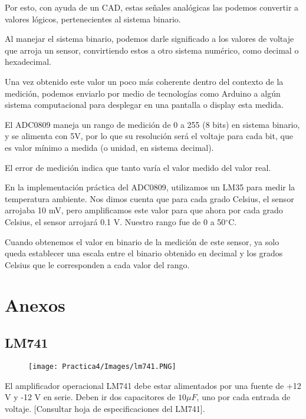 \documentclass[12pt]{article}
\begin{document}
	    Por esto, con ayuda de un CAD, estas señales analógicas las podemos convertir a valores lógicos, pertenecientes al sistema binario. 
	    
	    Al manejar el sistema binario, podemos darle significado a los valores de voltaje que arroja un sensor, convirtiendo estos a otro sistema numérico, como decimal o hexadecimal.
	    
	    Una vez obtenido este valor un poco más coherente dentro del contexto de la medición, podemos enviarlo por medio de tecnologías como Arduino a algún sistema computacional para desplegar en una pantalla o display esta medida.
	    
	    El ADC0809 maneja un rango de medición de 0 a 255 (8 bits) en sistema binario, y se alimenta con 5V, por lo que su resolución será el voltaje para cada bit, que es valor mínimo a medida (o unidad, en sistema decimal).
	    
	    El error de medición indica que tanto varía el valor medido del valor real.
	    
	    En la implementación práctica del ADC0809, utilizamos un LM35 para medir la temperatura ambiente. Nos dimos cuenta que para cada grado Celsius, el sensor arrojaba 10 mV, pero amplificamos este valor para que ahora por cada grado Celsius, el sensor arrojará 0.1 V. Nuestro rango fue de 0 a 50$^{\circ}$C.
	    
	    Cuando obtenemos el valor en binario de la medición de este sensor, ya solo queda establecer una escala entre el binario obtenido en decimal y los grados Celsius que le corresponden a cada valor del rango.
	    

		\newpage
	
	\section{Anexos}
	    \subsection{LM741}
	        \begin{figure}[h!]
                \centering
                \texttt{[image: Practica4/Images/lm741.PNG]}
            \end{figure} 
	        El amplificador operacional LM741 debe estar alimentados por una fuente de +12 V y -12 V en serie. Deben ir dos capacitores de $10\mu F$, uno por cada entrada de voltaje. [Consultar hoja de especificaciones del LM741].
	        
\end{document}
